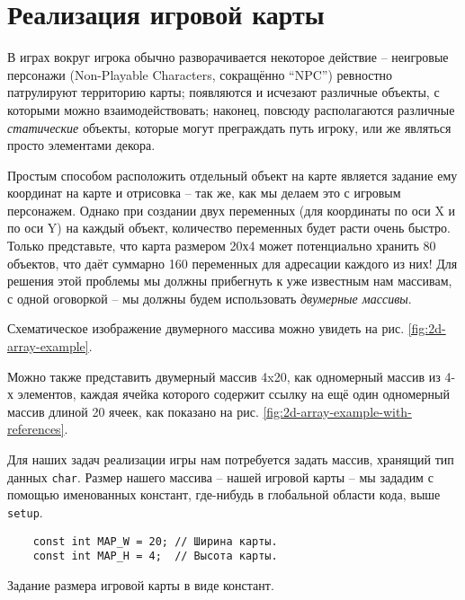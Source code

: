 \documentclass[../sparc.tex]{subfiles}
\begin{document}
\section{Реализация игровой карты}
\label{section:game-map}

В играх вокруг игрока обычно разворачивается некоторое действие -- неигровые
персонажи (Non-Playable Characters, сокращённо ``NPC'') ревностно патрулируют
территорию карты; появляются и исчезают различные объекты, с которыми можно
взаимодействовать; наконец, повсюду располагаются различные \emph{статические}
объекты, которые могут преграждать путь игроку, или же являться просто
элементами декора.

Простым способом расположить отдельный объект на карте является задание ему
координат на карте и отрисовка -- так же, как мы делаем это с игровым персонажем.
Однако при создании двух переменных (для координаты по оси X и по оси Y) на
каждый объект, количество переменных будет расти очень быстро.  Только
представьте, что карта размером 20х4 может потенциально хранить 80 объектов, что
даёт суммарно 160 переменных для адресации каждого из них!  Для решения этой
проблемы мы должны прибегнуть к уже известным нам массивам, с одной оговоркой --
мы должны будем использовать \emph{двумерные массивы}.

Схематическое изображение двумерного массива можно увидеть на
рис. \ref{fig:2d-array-example}.


Можно также представить двумерный массив 4x20, как одномерный массив из 4-х
элементов, каждая ячейка которого содержит ссылку на ещё один одномерный массив
длиной 20 ячеек, как показано на
рис. \ref{fig:2d-array-example-with-references}.


Для наших задач реализации игры нам потребуется задать массив, хранящий тип
данных \texttt{char}.  Размер нашего массива -- нашей игровой карты -- мы
зададим с помощью именованных констант, где-нибудь в глобальной области кода,
выше \texttt{setup}.

\begin{listing}[H]
  \begin{verbatim}
    const int MAP_W = 20; // Ширина карты.
    const int MAP_H = 4;  // Высота карты.
  \end{verbatim}
  \caption{Задание размера игровой карты в виде констант.}
  \label{listing:game-dev-map-size}
\end{listing}
\end{document}
